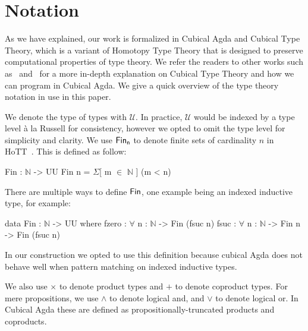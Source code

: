 \section{Notation}\label{sec:notation}
As we have explained, our work is formalized in Cubical Agda and Cubical Type Theory,
which is a variant of Homotopy Type Theory that is designed to preserve
computational properties of type theory.
We refer the readers to other works such as~\cite{vezzosiCubicalAgdaDependently2019}
and~\cite{cohenCubicalTypeTheory2018} for a more in-depth explanation on Cubical Type Theory
and how we can program in Cubical Agda. We give a quick overview of the type
theory notation in use in this paper.

We denote the type of types with $\mathcal{U}$. 
In practice, $\mathcal{U}$ would be indexed by a type level 
à la Russell for consistency, however we opted to omit the type level
for simplicity and clarity.
We use $\Fin[n]$ to denote finite sets of cardinality $n$ in HoTT~\cite{yorgeyCombinatorialSpeciesLabelled2014a}.
This is defined as follow:
\vspace{-1em}
\begin{code}
Fin : $\mathbb{N}$ -> UU
Fin n = $\Sigma$[ m $\in$ $\mathbb{N}$ ] (m < n)
\end{code}

\noindent
There are multiple ways to define $\Fin$, one example being an indexed inductive type,
for example:
\vspace{-1em}
\begin{code}
data Fin : $\mathbb{N}$ -> UU where
    fzero : $\forall$ {n : $\mathbb{N}$} -> Fin (fsuc n)
    fsuc  : $\forall$ {n : $\mathbb{N}$} -> Fin n -> Fin (fsuc n)
\end{code}
In our construction we opted to use this definition because cubical Agda does not behave well
when pattern matching on indexed inductive types.

We also use $\times$ to denote product types and $+$ to denote coproduct types.
For mere propositions, we use $\land$ to denote logical and, and $\vee$ to denote logical or.
In Cubical Agda these are defined as propositionally-truncated products and coproducts.